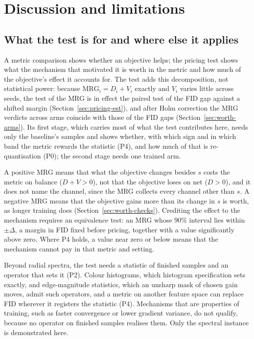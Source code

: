 \section{Discussion and limitations}
\label{sec:discussion}

\subsection{What the test is for and where else it applies}
\label{sec:discussion-use}

A metric comparison shows whether an objective helps; the pricing test shows
what the mechanism that motivated it is worth in the metric and how much of
the objective's effect it accounts for. The test adds this decomposition, not
statistical power: because $\mathrm{MRG}_i = D_i + V_i$ exactly and $V_i$
varies little across seeds, the test of the MRG is in effect the paired test
of the FID gap against a shifted margin (Section~\ref{sec:pricing-est}), and
after Holm correction the MRG verdicts across arms coincide with those of the
FID gaps (Section~\ref{sec:worth-arms}). Its first stage, which carries most
of what the test contributes here, needs only the baseline's samples and
shows whether, with which sign and in which band the metric rewards the
statistic (P4), and how much of that is re-quantisation (P0); the second
stage needs one trained arm.

A positive MRG means that what the objective changes besides $s$ costs the
metric on balance ($D + V > 0$), not that the objective loses on net
($D > 0$), and it does not name the channel, since the MRG collects every
channel other than $s$. A negative MRG means that the objective gains more than
its change in $s$ is worth, as longer training does
(Section~\ref{sec:worth-checks}). Crediting the effect to the mechanism
requires an equivalence test: an MRG whose 90\% interval lies within
$\pm\Delta$, a margin in FID fixed before pricing, together with a value
significantly above zero. Where P4 holds, a value near zero or below means
that the mechanism cannot pay in that metric and setting.

Beyond radial spectra, the test needs a statistic of finished samples and an
operator that sets it (P2). Colour histograms, which histogram
specification sets exactly, and edge-magnitude statistics, which an unsharp
mask of chosen gain moves, admit such operators, and a metric on another
feature space can replace FID wherever it registers the statistic (P4).
Mechanisms that are properties of training, such as faster convergence or
lower gradient variance, do not qualify, because no operator on finished
samples realises them. Only the spectral instance is demonstrated here.

